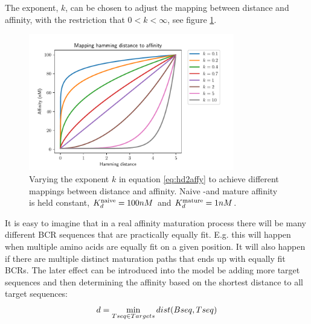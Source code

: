 The exponent, $k$, can be chosen to adjust the mapping between distance and affinity, with the restriction that $0 < k < \infty$, see figure \ref{fig:hd2affy}.
\begin{figure}
    \centering
    \includegraphics[width=0.8\textwidth]{figures/hd2affy.pdf}
    \caption{
        \label{fig:hd2affy}
        Varying the exponent $k$ in equation \ref{eq:hd2affy} to achieve different mappings between distance and affinity. Naive -and mature affinity is held constant, $K^{\text{naive}}_d = 100nM$ and $K^{\text{mature}}_d = 1nM$.
    }
\end{figure}

It is easy to imagine that in a real affinity maturation process there will be many different BCR sequences that are practically equally fit.
E.g. this will happen when multiple amino acids are equally fit on a given position.
It will also happen if there are multiple distinct maturation paths that ends up with equally fit BCRs.
The later effect can be introduced into the model be adding more target sequences and then determining the affinity based on the shortest distance to all target sequences:
$$
d = \mathop{\mathrm{\min}}\limits_{Tseq \in Targets} dist(Bseq, Tseq)
$$






